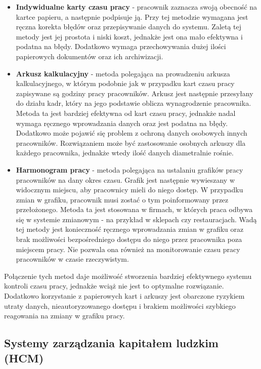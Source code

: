 \begin{itemize}
    \item \textbf{Indywidualne karty czasu pracy} - pracownik zaznacza swoją obecność na kartce papieru, a następnie podpisuje ją. Przy tej metodzie wymagana jest ręczna korekta błędów oraz przepisywanie danych do systemu. Zaletą tej metody jest jej prostota i niski koszt, jednakże jest ona mało efektywna i podatna na błędy. Dodatkowo wymaga przechowywania dużej ilości papierowych dokumentów oraz ich archiwizacji.
    \item \textbf{Arkusz kalkulacyjny} - metoda polegająca na prowadzeniu arkusza kalkulacyjnego, w którym podobnie jak w przypadku kart czasu pracy zapisywane są godziny pracy pracowników. Arkusz jest następnie przesyłany do działu kadr, który na jego podstawie oblicza wynagrodzenie pracownika. Metoda ta jest bardziej efektywna od kart czasu pracy, jednakże nadal wymaga ręcznego wprowadzania danych oraz jest podatna na błędy. Dodatkowo może pojawić się problem z ochroną danych osobowych innych pracowników. Rozwiązaniem może być zastosowanie osobnych arkuszy dla każdego pracownika, jednakże wtedy ilość danych diametralnie rośnie.
    \item \textbf{Harmonogram pracy} - metoda polegająca na ustalaniu grafików pracy pracowników na dany okres czasu. Grafik jest następnie wywieszany w widocznym miejscu, aby pracownicy mieli do niego dostęp. W przypadku zmian w grafiku, pracownik musi zostać o tym poinformowany przez przełożonego. Metoda ta jest stosowana w firmach, w których praca odbywa się w systemie zmianowym - na przykład w sklepach czy restauracjach. Wadą tej metody jest konieczność ręcznego wprowadzania zmian w grafiku oraz brak możliwości bezpośredniego dostępu do niego przez pracownika poza miejscem pracy. Nie pozwala ona również na monitorowanie czasu pracy pracowników w czasie rzeczywistym.
\end{itemize}

Połączenie tych metod daje możliwość stworzenia bardziej efektywnego systemu kontroli czasu pracy, jednakże wciąż nie jest to optymalne rozwiązanie. Dodatkowo korzystanie z papierowych kart i arkuszy jest obarczone ryzykiem utraty danych, nieautoryzowanego dostępu i brakiem możliwości szybkiego reagowania na zmiany w grafiku pracy.

\subsection{Systemy zarządzania kapitałem ludzkim (HCM)}

